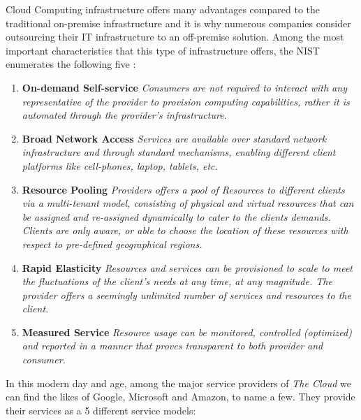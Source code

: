 \documentclass[11pt]{amsart}
\begin{document}
	Cloud Computing infrastructure offers many advantages compared to the traditional on-premise 
	infrastructure and it is why numerous companies consider outsourcing their IT infrastructure to 
	an off-premise solution. Among the most important characteristics that this type of 
	infrastructure offers, the NIST enumerates the following five \cite{nist}:
	\begin{enumerate}
		\item{\textbf{On-demand Self-service}} \emph{Consumers are not required to interact with 
		any representative of the provider to provision computing capabilities, rather it is 
		automated through the provider's infrastructure.}\\
		\item{\textbf{Broad Network Access}} \emph{Services are available over standard network 
		infrastructure and through standard	mechanisms, enabling different client platforms like 
		cell-phones, laptop, tablets, etc.}\\
		\item{\textbf{Resource Pooling}} \emph{Providers offers a pool of Resources to different 
		clients via a multi-tenant model, consisting of physical and virtual resources that can be 
		assigned and re-assigned dynamically to cater to the clients demands. Clients are only 
		aware, or able to choose the location of these resources with respect to pre-defined 
		geographical regions. }\\
		\item{\textbf{Rapid Elasticity}} \emph{Resources and services can be provisioned to scale 
		to meet the fluctuations of the client's needs at any time, at any magnitude. The provider
		offers a seemingly unlimited number of services and resources to the client.}\\
		\item{\textbf{Measured Service}} \emph{Resource usage can be monitored, controlled 
		(optimized) and reported in a manner that proves transparent to both provider and consumer.}
	\end{enumerate}
	
	In this modern day and age, among the major service providers of \emph{The Cloud} we can 
	find the likes of Google, Microsoft and Amazon, to name a few. They provide their services 
	as a 5 different service models:\\
	
\end{document}
